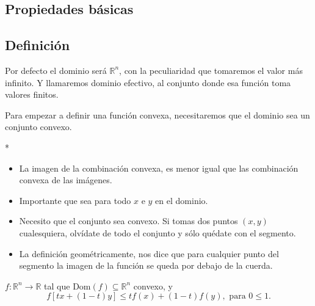 \begin{paracol}{2}

\section{Propiedades básicas}

\subsection{Definición}

Por defecto el dominio será $\mathbb{R}^n$, con la peculiaridad que tomaremos el valor más infinito.
Y llamaremos dominio efectivo, al conjunto donde esa función toma valores finitos.

\begin{tcolorbox}[colframe=white]
    Para empezar a definir una función convexa, necesitaremos que el dominio sea un conjunto convexo. 
\end{tcolorbox}

\switchcolumn[1]*{\noindent\scriptsize
	\begin{itemize}
	    \item La imagen de la combinación convexa, es  menor igual que las combinación convexa de las imágenes.
	    \item Importante que sea para todo $x$ e $y$ en el dominio.
	    \item Necesito que el conjunto sea convexo. Si tomas dos puntos $(x,y)$ cualesquiera, olvídate de todo el conjunto y sólo quédate con el segmento. 
	    \item La definición geométricamente, nos dice que para cualquier punto del segmento la imagen de la función se queda por debajo de la cuerda.
	\end{itemize}
}

\switchcolumn[0]\noindent
\begin{def.} $f:\mathbb{R}^n\to \mathbb{R}$ tal que $\text{Dom}(f)\subseteq \mathbb{R}^n$ convexo, y
    $$f\left[tx+(1-t)y\right]\leq tf(x)+(1-t)f(y), \text{ para } 0\leq 1.$$
\end{def.}


\end{paracol}
